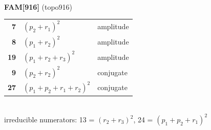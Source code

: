 \documentclass[10pt]{article}
\begin{document}
\begin{minipage}[t]{0.48\textwidth}
{}\\[2mm]\textbf{FAM[916]} (topo916)\\[2pt]{\footnotesize\begin{tabular}{@{}r@{\ \ }l@{\ \ }l@{}}\textbf{7} & $(p_2+r_1)^2$ & amplitude\\
\textbf{8} & $(p_1+r_2)^2$ & amplitude\\
\textbf{19} & $(p_1+r_2+r_3)^2$ & amplitude\\
\textbf{9} & $(p_2+r_2)^2$ & conjugate\\
\textbf{27} & $(p_1+p_2+r_1+r_2)^2$ & conjugate\\\end{tabular}}\\[2pt]{\scriptsize irreducible numerators: 13 = $(r_2+r_3)^2$, 24 = $(p_1+p_2+r_1)^2$}\end{minipage}

\bigskip
\end{document}
